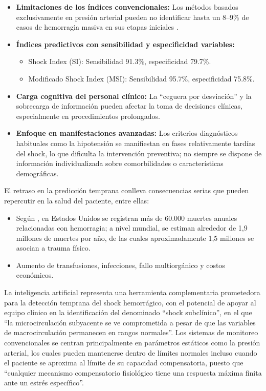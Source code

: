 \begin{itemize}
    \item \textbf{Limitaciones de los índices convencionales:} Los métodos basados exclusivamente en presión arterial pueden no identificar hasta un 8--9\% de casos de hemorragia masiva en sus etapas iniciales \cite{terceros2017}.
    \item \textbf{Índices predictivos con sensibilidad y especificidad variables:}
    \begin{itemize}
        \item Shock Index (SI): Sensibilidad 91.3\%, especificidad 79.7\%.
        \item Modificado Shock Index (MSI): Sensibilidad 95.7\%, especificidad 75.8\%.
    \end{itemize}
    \item \textbf{Carga cognitiva del personal clínico:} La ``ceguera por desviación'' y la sobrecarga de información pueden afectar la toma de decisiones clínicas, especialmente en procedimientos prolongados.
    \item \textbf{Enfoque en manifestaciones avanzadas:} Los criterios diagnósticos habituales como la hipotensión se manifiestan en fases relativamente tardías del shock, lo que dificulta la intervención preventiva; no siempre se dispone de información individualizada sobre comorbilidades o características demográficas.
\end{itemize}

El retraso en la predicción temprana conlleva consecuencias serias que pueden repercutir en la salud del paciente, entre ellas:

\begin{itemize}
    \item Según \cite{cannon2018}, en Estados Unidos se registran más de 60.000 muertes anuales relacionadas con hemorragia; a nivel mundial, se estiman alrededor de 1,9 millones de muertes por año, de las cuales aproximadamente 1,5 millones se asocian a trauma físico.
    \item Aumento de transfusiones, infecciones, fallo multiorgánico y costos económicos.
\end{itemize}

La inteligencia artificial representa una herramienta complementaria prometedora para la detección temprana del shock hemorrágico, con el potencial de apoyar al equipo clínico en la identificación del denominado ``shock subclínico'', en el que ``la microcirculación subyacente se ve comprometida a pesar de que las variables de macrocirculación permanecen en rangos normales''. Los sistemas de monitoreo convencionales se centran principalmente en parámetros estáticos como la presión arterial, los cuales pueden mantenerse dentro de límites normales incluso cuando el paciente se aproxima al límite de su capacidad compensatoria, puesto que ``cualquier mecanismo compensatorio fisiológico tiene una respuesta máxima finita ante un estrés específico''.


